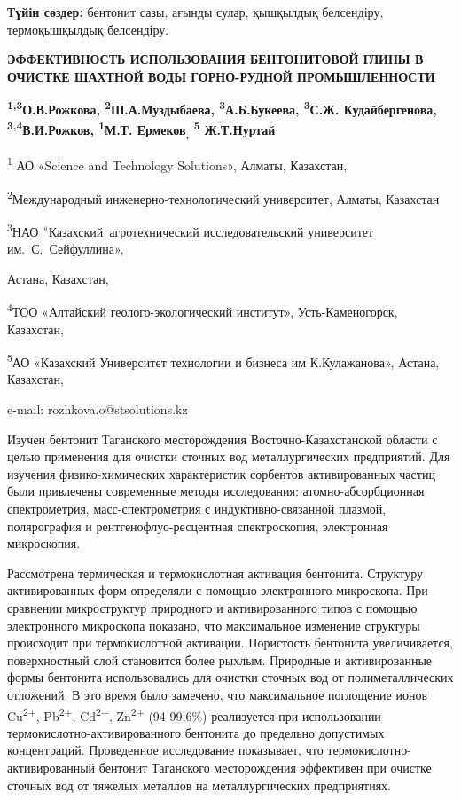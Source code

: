 {\bfseries Түйін сөздер:} бентонит сазы, ағынды сулар, қышқылдық
белсендіру, термоқышқылдық белсендіру.

\begin{center}
{\large\bfseries ЭФФЕКТИВНОСТЬ ИСПОЛЬЗОВАНИЯ БЕНТОНИТОВОЙ ГЛИНЫ В ОЧИСТКЕ ШАХТНОЙ
ВОДЫ ГОРНО-РУДНОЙ ПРОМЫШЛЕННОСТИ}

{\bfseries \textsuperscript{1,3}О.В.Рожкова, \textsuperscript{2}Ш.А.Муздыбаева, \textsuperscript{3}А.Б.Букеева, \textsuperscript{3}С.Ж. Кудайбергенова, \textsuperscript{3,4}В.И.Рожков, \textsuperscript{1}М.Т. Ермеков\textsubscript{,} \textsuperscript{5} Ж.Т.Нуртай}

\textsuperscript{1} АО «Science and Technology Solutions», Алматы,
Казахстан,

\textsuperscript{2}Международный инженерно-технологический университет,
Алматы, Казахстан

\textsuperscript{3}НАО \textsuperscript{«}Казахский~агротехнический
исследовательский университет им.~С.~Сейфуллина»,

Астана, Казахстан,

\textsuperscript{4}ТОО «Алтайский геолого-экологический институт»,
Усть-Каменогорск, Казахстан,

\textsuperscript{5}АО «Казахский Университет технологии и бизнеса им
К.Кулажанова», Астана, Казахстан,

e-mail: rozhkova.o@stsolutions.kz
\end{center}

Изучен бентонит Таганского месторождения Восточно-Казахстанской области
с целью применения для очистки сточных вод металлургических предприятий.
Для изучения физико-химических характеристик сорбентов активированных
частиц были привлечены современные методы исследования:
атомно-абсорбционная спектрометрия, масс-спектрометрия с
индуктивно-связанной плазмой, полярография и рентгенофлуо-ресцентная
спектроскопия, электронная микроскопия.

Рассмотрена термическая и термокислотная активация бентонита. Структуру
активированных форм определяли с помощью электронного микроскопа. При
сравнении микроструктур природного и активированного типов с помощью
электронного микроскопа показано, что максимальное изменение структуры
происходит при термокислотной активации. Пористость бентонита
увеличивается, поверхностный слой становится более рыхлым. Природные и
активированные формы бентонита использовались для очистки сточных вод от
полиметаллических отложений. В это время было замечено, что максимальное
поглощение ионов Cu\textsuperscript{2+}, Pb\textsuperscript{2+},
Cd\textsuperscript{2+}, Zn\textsuperscript{2+} (94-99,6\%) реализуется
при использовании термокислотно-активированного бентонита до предельно
допустимых концентраций. Проведенное исследование показывает, что
термокислотно-активированный бентонит Таганского месторождения
эффективен при очистке сточных вод от тяжелых металлов на
металлургических предприятиях.

